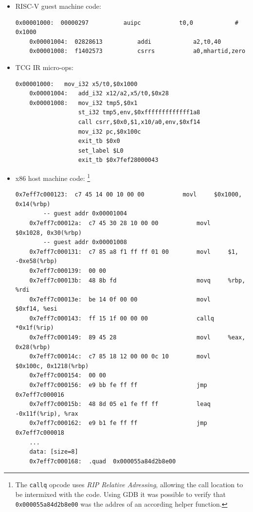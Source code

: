 \begin{itemize}
    \item{RISC-V guest machine code:
    \begin{lstlisting}[frame=tblr]
    0x00001000:  00000297          auipc           t0,0            # 0x1000
    0x00001004:  02828613          addi            a2,t0,40
    0x00001008:  f1402573          csrrs           a0,mhartid,zero
    \end{lstlisting}
    }
    \item{TCG IR micro-ops:
    \begin{lstlisting}[frame=tblr, label={lst:tcg:tcgir-microops}]
    0x00001000:   mov_i32 x5/t0,$0x1000
    0x00001004:   add_i32 x12/a2,x5/t0,$0x28
    0x00001008:   mov_i32 tmp5,$0x1
                  st_i32 tmp5,env,$0xfffffffffffff1a8
                  call csrr,$0x0,$1,x10/a0,env,$0xf14
                  mov_i32 pc,$0x100c
                  exit_tb $0x0
                  set_label $L0
                  exit_tb $0x7fef28000043
    \end{lstlisting}
    }
    \item{x86 host machine code:%
    \footnote{The \texttt{callq} opcode uses \textit{RIP Relative Adressing}, allowing the call location to be
    intermixed with the code. Using GDB it was possible to verify that \texttt{0x000055a84d2b8e00}
    was the addres of an according helper function.}
    \begin{lstlisting}[frame=tblr, label={lst:tcg:x86translated}]
    0x7eff7c000123:  c7 45 14 00 10 00 00           movl     $0x1000, 0x14(%rbp)
        -- guest addr 0x00001004
    0x7eff7c00012a:  c7 45 30 28 10 00 00           movl     $0x1028, 0x30(%rbp)
        -- guest addr 0x00001008
    0x7eff7c000131:  c7 85 a8 f1 ff ff 01 00        movl     $1, -0xe58(%rbp)
    0x7eff7c000139:  00 00
    0x7eff7c00013b:  48 8b fd                       movq     %rbp, %rdi
    0x7eff7c00013e:  be 14 0f 00 00                 movl     $0xf14, %esi
    0x7eff7c000143:  ff 15 1f 00 00 00              callq    *0x1f(%rip)
    0x7eff7c000149:  89 45 28                       movl     %eax, 0x28(%rbp)
    0x7eff7c00014c:  c7 85 18 12 00 00 0c 10        movl     $0x100c, 0x1218(%rbp)
    0x7eff7c000154:  00 00
    0x7eff7c000156:  e9 bb fe ff ff                 jmp      0x7eff7c000016
    0x7eff7c00015b:  48 8d 05 e1 fe ff ff           leaq     -0x11f(%rip), %rax
    0x7eff7c000162:  e9 b1 fe ff ff                 jmp      0x7eff7c000018
    ...
    data: [size=8]
    0x7eff7c000168:  .quad  0x000055a84d2b8e00
    \end{lstlisting}
    }
\end{itemize}

